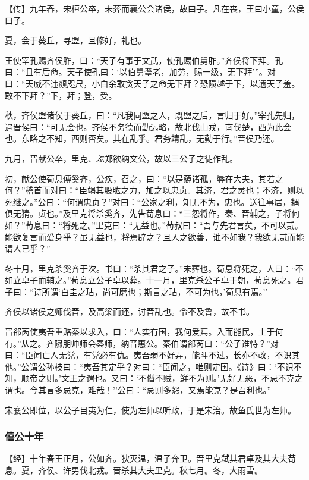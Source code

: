 \documentclass[]{article}
\begin{document}
【传】九年春，宋桓公卒，未葬而襄公会诸侯，故曰子。凡在丧，王曰小童，公侯曰子。

夏，会于葵丘，寻盟，且修好，礼也。

王使宰孔赐齐侯胙，曰：``天子有事于文武，使孔赐伯舅胙。''齐侯将下拜。孔曰：``且有后命。天子使孔曰：`以伯舅耋老，加劳，赐一级，无下拜'''。对曰：``天威不违颜咫尺，小白余敢贪天子之命无下拜？恐陨越于下，以遗天子羞。敢不下拜？''下，拜；登，受。

秋，齐侯盟诸侯于葵丘，曰：``凡我同盟之人，既盟之后，言归于好。''宰孔先归，遇晋侯曰：``可无会也。齐侯不务德而勤远略，故北伐山戎，南伐楚，西为此会也。东略之不知，西则否矣。其在乱乎。君务靖乱，无勤于行。''晋侯乃还。

九月，晋献公卒，里克、ぶ郑欲纳文公，故以三公子之徒作乱。

初，献公使荀息傅奚齐，公疾，召之，曰：``以是藐诸孤，辱在大夫，其若之何？''稽首而对曰：``臣竭其股肱之力，加之以忠贞。其济，君之灵也；不济，则以死继之。''公曰：``何谓忠贞？''对曰：``公家之利，知无不为，忠也。送往事居，耦俱无猜。贞也。''及里克将杀奚齐，先告荀息曰：``三怨将作，秦、晋辅之，子将何如？''荀息曰：``将死之。''里克曰：``无益也。''荀叔曰：``吾与先君言矣，不可以贰。能欲复言而爱身乎？虽无益也，将焉辟之？且人之欲善，谁不如我？我欲无贰而能谓人已乎？''

冬十月，里克杀奚齐于次。书曰：``杀其君之子。''未葬也。荀息将死之，人曰：``不如立卓子而辅之。''荀息立公子卓以葬。十一月，里克杀公子卓于朝，荀息死之。君子曰：``诗所谓`白圭之玷，尚可磨也；斯言之玷，不可为也，'荀息有焉。''

齐侯以诸侯之师伐晋，及高梁而还，讨晋乱也。令不及鲁，故不书。

晋郤芮使夷吾重赂秦以求入，曰：``人实有国，我何爱焉。入而能民，土于何有。''从之。齐隰朋帅师会秦师，纳晋惠公。秦伯谓郤芮曰：``公子谁恃？''对曰：``臣闻亡人无党，有党必有仇。夷吾弱不好弄，能斗不过，长亦不改，不识其他。''公谓公孙枝曰：``夷吾其定乎？对曰：``臣闻之，唯则定国。《诗》曰：`不识不知，顺帝之则。'文王之谓也。又曰：`不僭不贼，鲜不为则。'无好无恶，不忌不克之谓也。今其言多忌克，难哉！''公曰：``忌则多怨，又焉能克？是吾利也。''

宋襄公即位，以公子目夷为仁，使为左师以听政，于是宋治。故鱼氏世为左师。

\hypertarget{header-n753}{%
\subsubsection{僖公十年}\label{header-n753}}

【经】十年春王正月，公如齐。狄灭温，温子奔卫。晋里克弑其君卓及其大夫荀息。夏，齐侯、许男伐北戎。晋杀其大夫里克。秋七月。冬，大雨雪。
\end{document}
